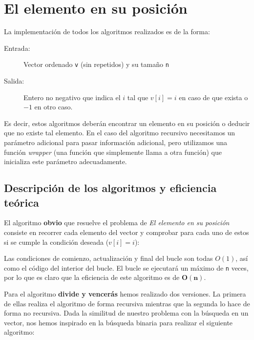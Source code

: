 \section{El elemento en su posición}

La implementación de todos los algoritmos realizados es de la forma:
\begin{description}
 \item[Entrada:] Vector ordenado \texttt{v} (sin repetidos) y su tamaño \texttt{n}
 \item[Salida:] Entero no negativo que indica el $i$ tal que $v[i]=i$ en caso de que exista o $-1$ en otro caso.
\end{description}

Es decir, estos algoritmos deberán encontrar un elemento en su posición o deducir que no existe tal elemento. En el caso del algoritmo recursivo necesitamos un parámetro adicional para pasar información adicional, pero utilizamos una función \textit{wrapper} (una función que simplemente llama a otra función) que inicializa este parámetro adecuadamente.

\subsection{Descripción de los algoritmos y eficiencia teórica}

El algoritmo \textbf{obvio} que resuelve el problema de \textit{El elemento en su posición} consiste
en recorrer cada elemento del vector y comprobar para cada uno de estos si se cumple la
condición deseada ($v[i] = i$):



Las condiciones de comienzo, actualización y final del bucle son todas $O(1)$, así como el código del interior del bucle. El bucle se ejecutará un máximo de \texttt{n} veces, por lo que es claro que la eficiencia de este algoritmo es de $\mathbf{O(n)}$.

\vspace*{0.3cm}
\noindent\hrulefill
\vspace*{0.3cm}

Para el algoritmo \textbf{divide y vencerás} hemos realizado dos versiones. La primera de ellas realiza el algoritmo de forma recursiva mientras que la segunda lo hace de forma no recursiva. Dada la similitud de nuestro problema con la búsqueda en un vector, nos hemos inspirado en la búsqueda binaria para realizar el siguiente algoritmo:


